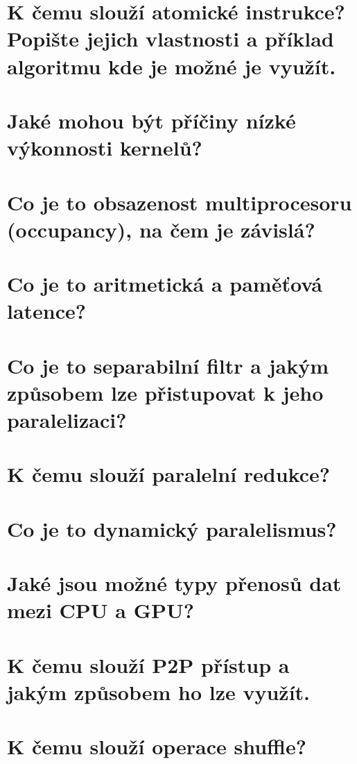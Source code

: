 \section{K čemu slouží atomické instrukce? Popište jejich vlastnosti a příklad algoritmu kde je možné je využít.}
	\todo


\section{Jaké mohou být příčiny nízké výkonnosti kernelů?}
	\todo


\section{Co je to obsazenost multiprocesoru (occupancy), na čem je závislá?}
	\todo


\section{Co je to aritmetická a paměťová latence?}
	\todo


\section{Co je to separabilní filtr a jakým způsobem lze přistupovat k jeho paralelizaci?}
	\todo


\section{K čemu slouží paralelní redukce?}
	\todo


\section{Co je to dynamický paralelismus?}
	\todo


\section{Jaké jsou možné typy přenosů dat mezi CPU a GPU?}
	\todo


\section{K čemu slouží P2P přístup a jakým způsobem ho lze využít.}
	\todo


\section{K čemu slouží operace shuffle?}
	\todo


